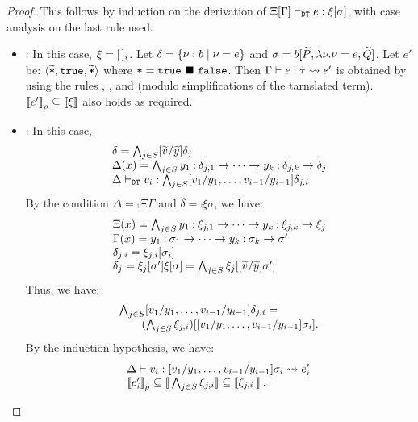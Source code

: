 \begin{proof}
This follows by induction on the derivation of \(\Xi[\Gamma] \vdash_{\texttt{DT}} e: \xi[\sigma]\),
with case analysis on the last rule used.

\begin{itemize}
\item \textit{{}}:
In this case, \(\xi = [\,]_i\).
Let \(\delta = \{\nu:b \mid \nu=e\}\) and \(\sigma=b[\widetilde{P},\lambda \nu.\nu=e,\widetilde{Q}]\).
Let \(e'\) be:
\(\langle{\widetilde{\texttt{*}},\mathtt{true},\widetilde{\texttt{*}}}\rangle\) where \(\texttt{*} = \mathtt{true}\ \blacksquare\ \mathtt{false}\).
Then \(\Gamma \vdash e : \tau \leadsto e'\) is obtained by using the rules
, , and  (modulo simplifications of the tarnslated term).
 \(\mathbin{[\![}e'\mathbin{]\!]}_{\rho}\subseteq\mathbin{[\![}\xi\mathbin{]\!]}\)
also holds as required.

\item \textit{}:
In this case,
\[
\begin{array}{l}
\delta = \bigwedge_{j\in S} [\widetilde{v}/\widetilde{y}]\delta_j\\
\Delta(x) = \bigwedge_{j\in S}y_1\mathbin{:}\delta_{j,1}\rightarrow \cdots \rightarrow y_k\mathbin{:}\delta_{j,k}\rightarrow \delta_j\\
\Delta \vdash_{\texttt{DT}} v_i: \bigwedge_{j\in S} [v_1/y_1,\ldots,v_{i-1}/y_{i-1}]\delta_{j,i}
\end{array}
\]
By the condition \(\Delta = \comp{\Xi}{\Gamma}\) and \(\delta = \comp{\xi}{\sigma}\), we have:
\[
\begin{array}{l}
\Xi(x) = \bigwedge_{j\in S}y_1\mathbin{:}\xi_{j,1}\rightarrow \cdots \rightarrow y_k\mathbin{:}\xi_{j,k}\rightarrow \xi_j\\
\Gamma(x) = y_1\mathbin{:} \sigma_1\rightarrow \cdots \rightarrow y_k\mathbin{:}\sigma_k\rightarrow \sigma'\\
\delta_{j,i} = \xi_{j,i}[\sigma_i]\\
\delta_j = \xi_j[\sigma']
\xi[\sigma] = \bigwedge_{j\in S} \xi_j[[\widetilde{v}/\widetilde{y}]\sigma']
\end{array}
\]
Thus, we have:
\[
\begin{array}{l}
\bigwedge_{j\in S}
  [v_1/y_1,\ldots,v_{i-1}/y_{i-1}]\delta_{j,i} =\\
\qquad (\bigwedge_{j\in S}\xi_{j,i})[[v_1/y_1,\ldots,v_{i-1}/y_{i-1}]\sigma_{i}].
\end{array}\]
By the induction hypothesis, we have:
\[
\begin{array}{l}
\Delta \vdash v_i : [v_1/y_1,\ldots,v_{i-1}/y_{i-1}]\sigma_{i} \leadsto e'_{i}\\
\mathbin{[\![}e_i'\mathbin{]\!]}_{\rho} \subseteq \mathbin{[\![}\bigwedge_{j\in S}\xi_{j,i}\mathbin{]\!]} 
  \subseteq \mathbin{[\![}\xi_{j,i}\mathbin{]\!]}.
\end{array}
\]


\end{itemize}
\end{proof}
